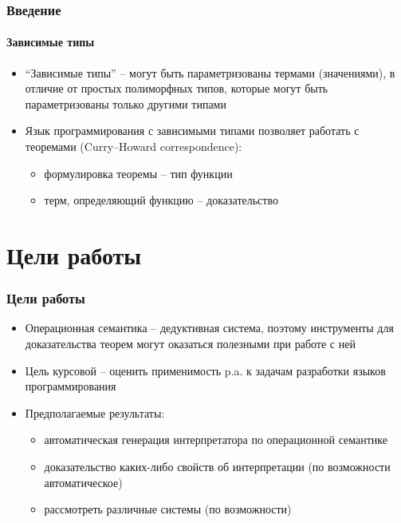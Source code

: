 \documentclass[10pt,pdf,hyperref={unicode}]{beamer}
\begin{document}
      \begin{frame}
         \frametitle{Введение}
         \framesubtitle{Зависимые типы}
         \begin{itemize}
            \item ``Зависимые типы'' -- могут быть параметризованы термами (значениями),
             в отличие от простых полиморфных типов, которые могут быть
             параметризованы только другими типами
            \item Язык программирования с зависимыми типами позволяет работать
             с теоремами (Curry--Howard correspondence):
               \begin{itemize}
                  \item формулировка теоремы -- тип функции
                  \item терм, определяющий функцию -- доказательство
               \end{itemize}
         \end{itemize}
      \end{frame}

      \section{Цели работы}

      \begin{frame}
         \frametitle{Цели работы}
         \begin{itemize}
            \item Операционная семантика -- дедуктивная система, поэтому
             инструменты для доказательства теорем могут оказаться полезными при работе с ней
            \item Цель курсовой -- оценить применимость p.a. к задачам разработки языков программирования
            \item Предполагаемые результаты:
            \begin{itemize}
               \item автоматическая генерация интерпретатора по операционной семантике
               \item доказательство каких-либо свойств об интерпретации (по возможности автоматическое)
               \item рассмотреть различные системы (по возможности)
            \end{itemize}
         \end{itemize}
      \end{frame}
\end{document}

